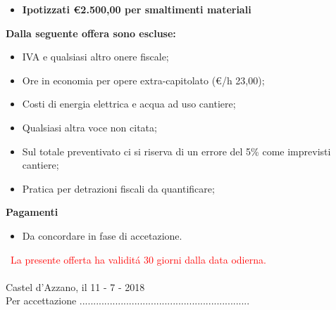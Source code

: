 \documentclass[a4paper]{article}
\begin{document}
  \begin{itemize}
      \item \textbf{Ipotizzati \euro 2.500,00 per smaltimenti materiali}
  \end{itemize}

  \noindent\textbf{Dalla seguente offera sono escluse:}
  \begin{itemize}
      \item IVA e qualsiasi altro onere fiscale;
      \item Ore in economia per opere extra-capitolato (\euro/h 23,00);
      \item Costi di energia elettrica e acqua ad uso cantiere;
      \item Qualsiasi altra voce non citata;
      \item Sul totale preventivato ci si riserva di un errore del 5\% come imprevisti cantiere;
      \item Pratica per detrazioni fiscali da quantificare;
  \end{itemize}

  \noindent\textbf{Pagamenti}
  \begin{itemize}
      \item Da concordare in fase di accetazione.
  \end{itemize}
  \
  \textcolor{red}{La presente offerta ha validit\'a 30 giorni dalla data odierna.}\\
  \\
  Castel d'Azzano, il 11 - 7 - 2018
  \vspace{1cm}\\
  Per accettazione ..............................................................
\end{document}
